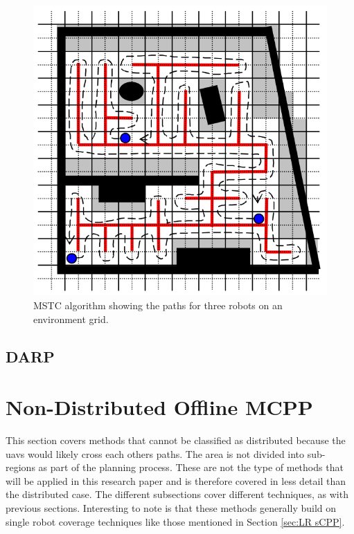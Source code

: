 \begin{figure}[h!]
\centering
\includegraphics[scale=0.4]{figs/MSTC-Graphic}
\caption{MSTC algorithm showing the paths for three robots on an environment grid. \cite{Hazon2005}}
\label{fig:MSTC}
\end{figure}

\subsection{DARP}
\label{sec:LR DARP}
\section{Non-Distributed Offline MCPP}
\label{sec:LR Non-Distributed MCPP}
This section covers methods that cannot be classified as distributed because the \acp{uav} would likely cross each others paths. The area is not divided into sub-regions as part of the planning process. These are not the type of methods that will be applied in this research paper and is therefore covered in less detail than the distributed case. The different subsections cover different techniques, as with previous sections. Interesting to note is that these methods generally build on single robot coverage techniques like those mentioned in Section \ref{sec:LR sCPP}.

